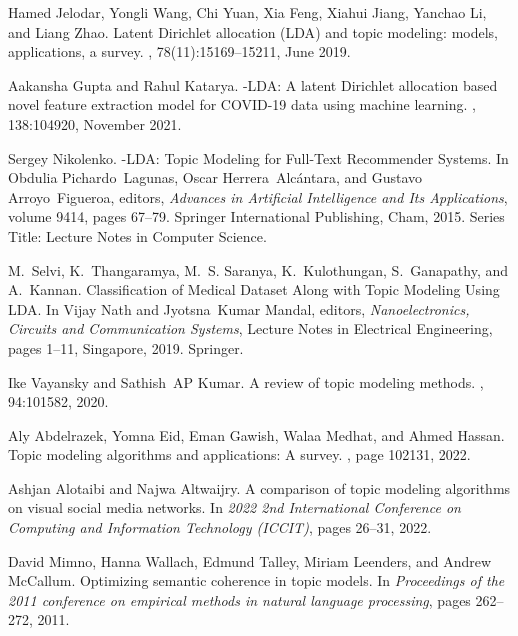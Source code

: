 \begin{thebibliography}{10}
Hamed Jelodar, Yongli Wang, Chi Yuan, Xia Feng, Xiahui Jiang, Yanchao Li, and
  Liang Zhao.
\newblock Latent {Dirichlet} allocation ({LDA}) and topic modeling: models,
  applications, a survey.
, 78(11):15169--15211, June
  2019.

Aakansha Gupta and Rahul Katarya.
-{LDA}: {A} latent {Dirichlet} allocation based novel feature
  extraction model for {COVID}-19 data using machine learning.
, 138:104920, November 2021.

Sergey Nikolenko.
-{LDA}: {Topic} {Modeling} for {Full}-{Text} {Recommender}
  {Systems}.
\newblock In Obdulia Pichardo~Lagunas, Oscar Herrera~Alcántara, and Gustavo
  Arroyo~Figueroa, editors, {\em Advances in {Artificial} {Intelligence} and
  {Its} {Applications}}, volume 9414, pages 67--79. Springer International
  Publishing, Cham, 2015.
\newblock Series Title: Lecture Notes in Computer Science.

M.~Selvi, K.~Thangaramya, M.~S. Saranya, K.~Kulothungan, S.~Ganapathy, and
  A.~Kannan.
\newblock Classification of {Medical} {Dataset} {Along} with {Topic} {Modeling}
  {Using} {LDA}.
\newblock In Vijay Nath and Jyotsna~Kumar Mandal, editors, {\em
  Nanoelectronics, {Circuits} and {Communication} {Systems}}, Lecture {Notes}
  in {Electrical} {Engineering}, pages 1--11, Singapore, 2019. Springer.

Ike Vayansky and Sathish~AP Kumar.
\newblock A review of topic modeling methods.
, 94:101582, 2020.

Aly Abdelrazek, Yomna Eid, Eman Gawish, Walaa Medhat, and Ahmed Hassan.
\newblock Topic modeling algorithms and applications: A survey.
, page 102131, 2022.

Ashjan Alotaibi and Najwa Altwaijry.
\newblock A comparison of topic modeling algorithms on visual social media
  networks.
\newblock In {\em 2022 2nd International Conference on Computing and
  Information Technology (ICCIT)}, pages 26--31, 2022.

David Mimno, Hanna Wallach, Edmund Talley, Miriam Leenders, and Andrew
  McCallum.
\newblock Optimizing semantic coherence in topic models.
\newblock In {\em Proceedings of the 2011 conference on empirical methods in
  natural language processing}, pages 262--272, 2011.


\end{thebibliography}
